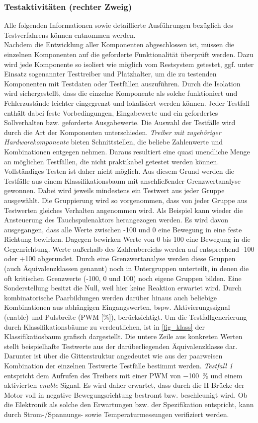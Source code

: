 \subsubsection{Testaktivitäten (rechter Zweig)}
Alle folgenden Informationen sowie detaillierte Ausführungen bezüglich des Testverfahrens können \cite{BasSof} entnommen werden.\\
Nachdem die Entwicklung aller Komponenten abgeschlossen ist, müssen die einzelnen Komponenten auf die geforderte Funktionalität überprüft werden. Dazu wird jede Komponente so isoliert wie möglich vom Restsystem getestet, ggf. unter Einsatz sogenannter Testtreiber und Platzhalter, um die zu testenden Komponenten mit Testdaten oder Testfällen auszuführen. Durch die Isolation wird sichergestellt, dass die einzelne Komponente als solche funktioniert und Fehlerzustände leichter eingegrenzt und lokalisiert werden können. Jeder Testfall enthält dabei feste Vorbedingungen, Eingabewerte und ein gefordertes Sollverhalten bzw. geforderte Ausgabewerte. Die Auswahl der Testfälle wird durch die Art der Komponenten unterschieden. \textit{Treiber mit zugehöriger Hardwarekomponente} bieten Schnittstellen, die beliebe Zahlenwerte und Kombinationen entgegen nehmen. Daraus resultiert eine quasi unendliche Menge an möglichen Testfällen, die nicht praktikabel getestet werden können. Vollständiges Testen ist daher nicht möglich. Aus diesem Grund werden die Testfälle aus einem Klassifikationsbaum mit anschließender Grenzwertanalyse gewonnen. Dabei wird jeweils mindestens ein Testwert aus jeder Gruppe ausgewählt. Die Gruppierung wird so vorgenommen, dass von jeder Gruppe aus Testwerten gleiches Verhalten angenommen wird. Als Beispiel kann wieder die Ansteuerung des Tauchspulenaktors herangezogen werden. Es wird davon ausgegangen, dass alle Werte zwischen -100 und 0 eine Bewegung in eine feste Richtung bewirken. Dagegen bewirken Werte von 0 bis 100 eine Bewegung in die Gegenrichtung. Werte außerhalb des Zahlenbereichs werden auf entsprechend -100 oder +100 abgerundet. Durch eine Grenzwertanalyse werden diese Gruppen (auch Äquivalenzklassen genannt) noch in Untergruppen unterteilt, in denen die oft kritischen Grenzwerte (-100, 0 und 100) noch eigene Gruppen bilden. Eine Sonderstellung besitzt die Null, weil hier keine Reaktion erwartet wird. Durch kombinatorische Paarbildungen werden darüber hinaus auch beliebige Kombinationen aus abhängigen Eingangswerten, bspw. Aktivierungssignal (enable) und Pulsbreite (PWM [\%]), berücksichtigt. Um die Testfallgenerierung durch Klassifikationsbäume zu verdeutlichen, ist in \autoref{fig_klass} der Klassifikatiosbaum grafisch dargestellt. Die untere Zeile aus konkreten Werten stellt beispielhafte Testwerte aus der darüberliegenden Äquivalenzklasse dar. Darunter ist über die Gitterstruktur angedeutet wie aus der paarweisen Kombination der einzelnen Testwerte Testfälle bestimmt werden. \textit{Testfall 1} entspricht dem Aufrufen des Treibers mit einer PWM von \SI{-100}{\%} und einem aktivierten \textit{enable}-Signal. Es wird daher erwartet, dass durch die H-Brücke der Motor voll in \glqq negative\grqq{} Bewegungsrichtung bestromt bzw. beschleunigt wird. Ob die Elektronik als solche den Erwartungen bzw. der Spezifikation entspricht, kann durch Strom-/Spannungs- sowie Temperaturmessungen verifiziert werden. 
